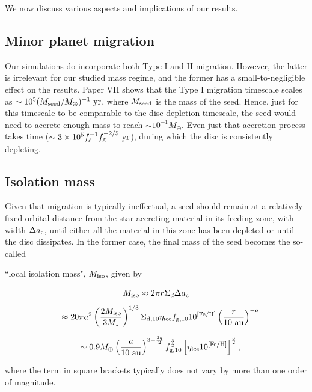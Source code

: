 \documentclass[useAMS,usenatbib]{mn2e}
\newcommand{\rev}{ }
\begin{document}
We now discuss various aspects and implications of our results.


\subsection{Minor planet migration}

Our simulations do incorporate both Type I and II migration. However, the latter is irrelevant for our studied mass regime, and the former has a small-to-negligible effect on the results. Paper VII shows that the Type I migration timescale scales as $\sim 10^5 (M_{\rm seed}/M_{\oplus})^{-1}~{\rm yr}$, where $M_{\rm seed}$ is the mass of the seed. Hence, just for this timescale to be comparable to the disc depletion timescale, the seed would need to accrete enough mass to reach $\sim 10^{-1}M_{\oplus}$. Even just that accretion process takes time ($\sim 3\times 10^5 f_{\rm d}^{-1}f_{\rm g}^{-2/5}~{\rm yr}$), during which the disc is consistently depleting.

\subsection{Isolation mass}

Given that migration is typically ineffectual, a seed should remain at a relatively fixed orbital distance from the star accreting material in its feeding zone, with width $\Delta a_{\rm c}$, until either all the material in this zone has been depleted or until the disc dissipates. In the former case, the final mass of the seed becomes the so-called {\rev ``local isolation mass", $M_{\rm iso}$, given by

\[
M_{\rm iso} \approx 2 \pi r \Sigma_d \Delta a_{\rm c}
\]
\[
\ \ \ 
\approx 20 \pi a^2 \left( \frac{2M_{\rm iso}}{3M_{\star}} \right)^{1/3}
\Sigma_{\rm d,10}\eta_{\rm ice}f_{\rm g,10} 10^{\left[{\rm Fe/H}\right]}
       \left( \frac{r}{10 {\rm \ au}} \right)^{-q}
\]


\begin{equation}       
\ \ \ 
\sim 0.9 M_{\oplus} \left(\frac{a}{10~{\rm au}} \right)^{3-\frac{3q}{2}}
f_{\rm g,10}^{\frac{3}{2}}\left[ \eta_{\rm ice} 10^{\left[{\rm Fe/H}\right]} \right]^{\frac{3}{2}}      
,
\label{Miso}
\end{equation}
}

\noindent{}where the term in square brackets typically does not vary by more than one order of magnitude.
\end{document}
